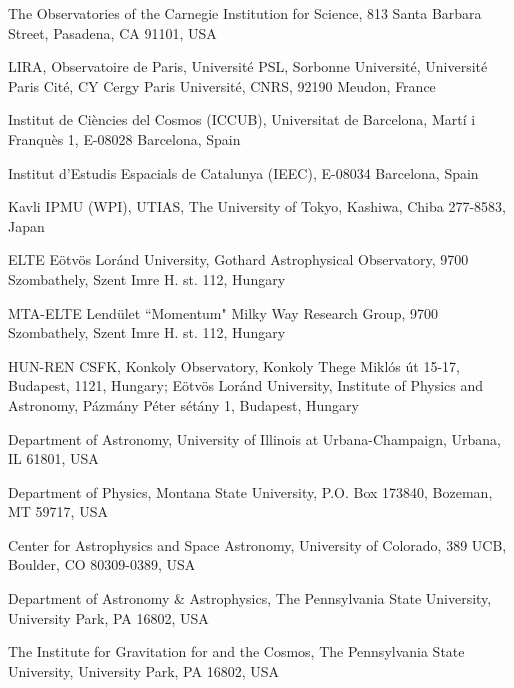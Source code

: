 \documentclass{natureprintstyle}
\begin{document}
{\begin{affiliations}
\item The Observatories of the Carnegie Institution for Science, 813 Santa Barbara Street, Pasadena, CA 91101, USA
\item LIRA, Observatoire de Paris, Universit\'e PSL, Sorbonne Universit\'e, Universit\'e Paris Cit\'e, CY Cergy Paris Universit\'e, CNRS, 92190 Meudon, France
\item Institut de Ci\`{e}ncies del Cosmos (ICCUB), Universitat de Barcelona, Mart\'{i} i Franqu\`{e}s 1, E-08028 Barcelona, Spain
\item Institut d'Estudis Espacials de Catalunya (IEEC), E-08034 Barcelona, Spain
\item Kavli IPMU (WPI), UTIAS, The University of Tokyo, Kashiwa, Chiba 277-8583, Japan
\item ELTE E\"otv\"os Lor\'and University, Gothard Astrophysical Observatory, 9700 Szombathely, Szent Imre H. st. 112, Hungary
\item MTA-ELTE Lend{\"u}let ``Momentum" Milky Way Research Group, 9700 Szombathely, Szent Imre H. st. 112, Hungary
\item HUN-REN CSFK, Konkoly Observatory, Konkoly Thege Mikl\'os \'ut 15-17, Budapest, 1121, Hungary; E\"otv\"os Lor\'and University, Institute of Physics and Astronomy, P\'azm\'any P\'eter s\'et\'any 1, Budapest, Hungary
\item Department of Astronomy, University of Illinois at Urbana-Champaign, Urbana, IL 61801, USA
\item Department of Physics, Montana State University, P.O. Box 173840, Bozeman, MT 59717, USA
\item Center for Astrophysics and Space Astronomy, University of Colorado, 389 UCB, Boulder, CO 80309-0389, USA
\item Department of Astronomy \& Astrophysics, The Pennsylvania State University, University Park, PA 16802, USA
\item The Institute for Gravitation for and the Cosmos, The Pennsylvania State University, University Park, PA 16802, USA
\end{affiliations}
}
\end{document}
